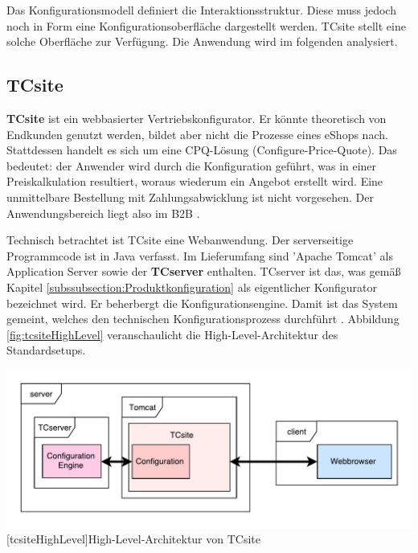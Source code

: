 \documentclass[12pt,a4paper,bibliography=totocnumbered,listof=totoc]{scrartcl}
\begin{document}
Das Konfigurationsmodell definiert die Interaktionsstruktur. Diese muss jedoch noch in Form eine Konfigurationsoberfläche dargestellt werden. TCsite stellt eine solche Oberfläche zur Verfügung. Die Anwendung wird im folgenden analysiert.

\subsection{TCsite}
\label{subsection:TCsite}
\textbf{TCsite} ist ein webbasierter Vertriebskonfigurator. Er könnte theoretisch von Endkunden genutzt werden, bildet aber nicht die Prozesse eines eShops nach. Stattdessen handelt es sich um eine CPQ-Lösung (Configure-Price-Quote). Das bedeutet: der Anwender wird durch die Konfiguration geführt, was in einer Preiskalkulation resultiert, woraus wiederum ein Angebot erstellt wird. Eine unmittelbare Bestellung mit Zahlungsabwicklung ist nicht vorgesehen. Der Anwendungsbereich liegt also im B2B \citep{tactonAbout}.

Technisch betrachtet ist TCsite eine Webanwendung. Der serverseitige Programmcode ist in Java verfasst. Im Lieferumfang sind 'Apache Tomcat' als Application Server sowie der \textbf{TCserver} enthalten. TCserver ist das, was gemäß Kapitel \ref{subssubsection:Produktkonfiguration} als eigentlicher Konfigurator bezeichnet wird. Er beherbergt die Konfigurationsengine. Damit ist das System gemeint, welches den technischen Konfigurationsprozess durchführt \citep{tactonTCsiteHandbook}. Abbildung \ref{fig:tcsiteHighLevel} veranschaulicht die High-Level-Architektur des Standardsetups.

\vspace{1em}
\begin{minipage}{\linewidth}
	\centering
	\includegraphics[width=1\linewidth]{Abbildungen/tcsiteHighLevel.pdf}
	[tcsiteHighLevel]{High-Level-Architektur von TCsite}
	\label{fig:tcsiteHighLevel}
\end{minipage}
\vspace{1em}
\end{document}
